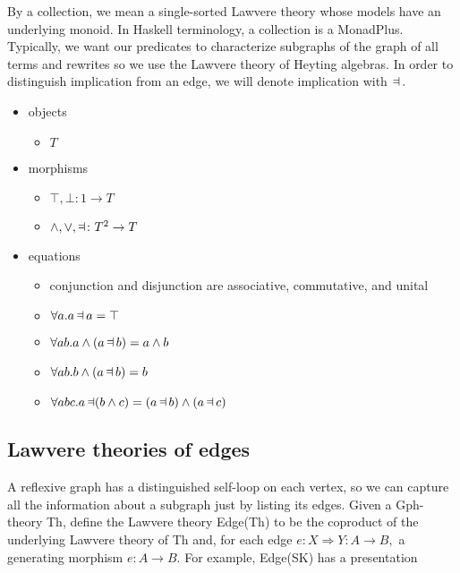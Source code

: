 \documentclass[submission,copyright,creativecommons]{eptcs}
\newcommand{\maps}{\colon}
\newcommand{\imp}{\mathop{\mbox{\reflectbox{$\vDash$}}}}
\begin{document}
By a collection, we mean a single-sorted Lawvere theory whose models have an underlying monoid.  In Haskell terminology, a collection is a MonadPlus.  Typically, we want our predicates to characterize subgraphs of the graph of all terms and rewrites so we use the Lawvere theory of Heyting algebras.  In order to distinguish implication from an edge, we will denote implication with $\imp.$
\begin{itemize}
  \item objects
    \begin{itemize}
      \item $T$
    \end{itemize}
  \item morphisms
    \begin{itemize}
      \item $\top, \bot\maps 1 \to T$
      \item $\land, \lor, \imp\maps T^2 \to T$
    \end{itemize}
  \item equations
    \begin{itemize}
      \item conjunction and disjunction are associative, commutative, and unital
      \item $\forall a.a \imp a = \top$
      \item $\forall ab.a \land (a \imp b) = a \land b$
      \item $\forall ab.b \land (a \imp b) = b$
      \item $\forall abc.a \imp (b \land c) = (a \imp b) \land (a \imp c)$
    \end{itemize}
\end{itemize}

\subsection{Lawvere theories of edges}

A reflexive graph has a distinguished self-loop on each vertex, so we can capture all the information about a subgraph just by listing its edges.  Given a Gph-theory Th, define the Lawvere theory Edge(Th) to be the coproduct of the underlying Lawvere theory of Th and, for each edge $e\maps X \Rightarrow Y \maps A \to B,$ a generating morphism $e\maps A \to B.$  For example, Edge(SK) has a presentation
\end{document}
